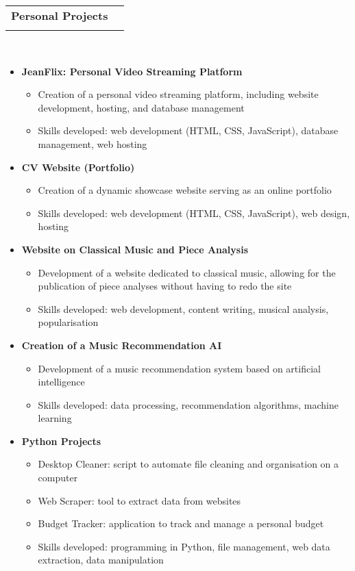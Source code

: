\documentclass[letterpaper,11pt]{article}
\makeatletter
\newcommand{\ressubheading}[4]{
\begin{tabular*}{6.5in}{l@{\cftdotfill{\cftsecdotsep}\extracolsep{\fill}}r}
    \textbf{#1} & #2 \\
    \textit{#3} & \textit{#4} \\
\end{tabular*}\vspace{-6pt}}
\makeatother
\begin{document}
\ressubheading{Personal Projects}{}{}{}\\
\vspace{-0.5cm}
\begin{itemize}[label={}]
\item \textbf{JeanFlix: Personal Video Streaming Platform}
\begin{itemize}
\item Creation of a personal video streaming platform, including website development, hosting, and database management
\item Skills developed: web development (HTML, CSS, JavaScript), database management, web hosting
\end{itemize}

\item \textbf{CV Website (Portfolio)}
\begin{itemize}
\item Creation of a dynamic showcase website serving as an online portfolio
\item Skills developed: web development (HTML, CSS, JavaScript), web design, hosting
\end{itemize}

\item \textbf{Website on Classical Music and Piece Analysis}
\begin{itemize}
\item Development of a website dedicated to classical music, allowing for the publication of piece analyses without having to redo the site
\item Skills developed: web development, content writing, musical analysis, popularisation
\end{itemize}

\item \textbf{Creation of a Music Recommendation AI}
\begin{itemize}
\item Development of a music recommendation system based on artificial intelligence
\item Skills developed: data processing, recommendation algorithms, machine learning
\end{itemize}

\item \textbf{Python Projects}
\begin{itemize}
\item Desktop Cleaner: script to automate file cleaning and organisation on a computer
\item Web Scraper: tool to extract data from websites
\item Budget Tracker: application to track and manage a personal budget
\item Skills developed: programming in Python, file management, web data extraction, data manipulation
\end{itemize}


\end{itemize}
\end{document}
